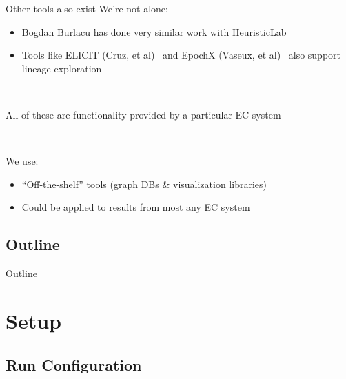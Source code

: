 \documentclass{beamer}
\begin{document}
\begin{frame}{Other tools also exist}
We're not alone:
\begin{itemize}
	\item Bogdan Burlacu has done very similar work with HeuristicLab~\cite{Burlacu:2013:GECCOcomp:new, Burlacu:CIEES:2015}
    \item Tools like ELICIT (Cruz, et al)~\cite{cruz2015elicit} and EpochX (Vaseux, et al)~\cite{vaseux2013event} also support lineage exploration
\end{itemize}

~

All of these are functionality provided by a particular EC system

~

We use:
\begin{itemize}
	\item ``Off-the-shelf'' tools (graph DBs \& visualization libraries)
    \item Could be applied to results from most any EC system
\end{itemize}
\end{frame}

\subsection*{Outline}

\begin{frame}{Outline}
  \tableofcontents[hideallsubsections]
\end{frame}


\section{Setup}

\subsection{Run Configuration}
\end{document}
